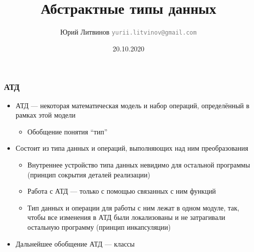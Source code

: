 \documentclass[xetex,mathserif,serif]{beamer}
\title{Абстрактные типы данных}
\author[Юрий Литвинов]{Юрий Литвинов \newline \textcolor{gray}{\small\texttt{yurii.litvinov@gmail.com}}}
\date{20.10.2020}
\begin{document}
    
    \frame{\titlepage}
    
    \begin{frame}
        \frametitle{АТД}
        \begin{itemize}
            \item АТД --- некоторая математическая модель и набор операций, определённый в рамках этой модели
            \begin{itemize}
                \item Обобщение понятия ``тип''
            \end{itemize}
            \item Состоит из типа данных и операций, выполняющих над ним преобразования
            \begin{itemize}
                \item Внутреннее устройство типа данных невидимо для остальной программы (принцип сокрытия деталей реализации)
                \item Работа с АТД --- только с помощью связанных с ним функций
                \item Тип данных и операции для работы с ним лежат в одном модуле, так, чтобы все изменения в АТД были локализованы и не затрагивали остальную программу (принцип инкапсуляции)
            \end{itemize}
            \item Дальнейшее обобщение АТД --- классы
        \end{itemize}
    \end{frame}
\end{document}
